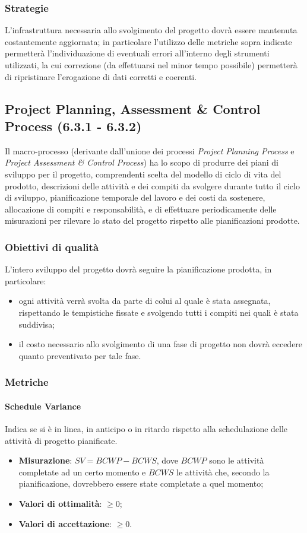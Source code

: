 \subsubsection{Strategie}
L'infrastruttura necessaria allo svolgimento del progetto dovrà essere mantenuta costantemente aggiornata; in particolare l'utilizzo delle metriche sopra indicate permetterà l'individuazione di eventuali errori all'interno degli strumenti utilizzati, la cui correzione (da effettuarsi nel minor tempo possibile) permetterà di ripristinare l'erogazione di dati corretti e coerenti.
\subsection{Project Planning, Assessment \& Control Process (6.3.1 - 6.3.2)}
\label{projPlanAssControl}
Il macro-processo (derivante dall'unione dei processi \textit{Project Planning Process} e \textit{Project Assessment \& Control Process}) ha lo scopo di produrre dei piani di sviluppo per il progetto, comprendenti scelta del modello di ciclo di vita  del prodotto, descrizioni delle attività e dei compiti da svolgere durante tutto il ciclo di sviluppo, pianificazione temporale del lavoro e dei costi da sostenere, allocazione di compiti e responsabilità, e di effettuare periodicamente delle misurazioni per rilevare lo stato del progetto rispetto alle pianificazioni prodotte.
\subsubsection{Obiettivi di qualità}
L'intero sviluppo del progetto dovrà seguire la pianificazione prodotta, in particolare:
\begin{itemize}
\item ogni attività verrà svolta da parte di colui al quale è stata assegnata, rispettando le tempistiche fissate e svolgendo tutti i compiti nei quali è stata suddivisa;
\item il costo necessario allo svolgimento di una fase di progetto non dovrà eccedere quanto preventivato per tale fase.
\end{itemize}
\subsubsection{Metriche}
\paragraph{Schedule Variance}
\label{scheduleVariance}
Indica se si è in linea, in anticipo o in ritardo rispetto alla schedulazione delle attività di progetto pianificate.
\begin{itemize}
\item \textbf{Misurazione}: $SV = BCWP - BCWS$, dove $BCWP$ sono le attività completate ad un certo momento e $BCWS$ le attività che, secondo la pianificazione, dovrebbero essere state completate a quel momento;
\item \textbf{Valori di ottimalità}: $\geq 0$;
\item \textbf{Valori di accettazione}: $\geq 0$.
\end{itemize}
